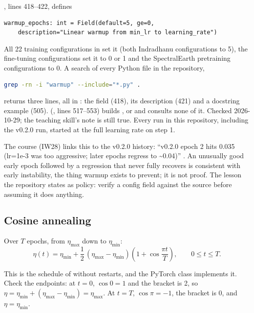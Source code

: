 \begin{sourcenote}
, lines 418--422, defines
\begin{lstlisting}
warmup_epochs: int = Field(default=5, ge=0,
    description="Linear warmup from min_lr to learning_rate")
\end{lstlisting}
All 22 training configurations in  set it (both Indradhanu configurations to 5),
the fine-tuning configurations set it to 0 or 1 and the SpectralEarth pretraining configurations to
0. A search of every Python file in the repository,
\begin{lstlisting}[language=bash]
grep -rn -i "warmup" --include="*.py" .
\end{lstlisting}
returns three lines, all in : the field (418), its description (421)
and a docstring example (505). 
(, lines 517--553) builds ,
 or  and consults none of it. Checked 2026-10-29; the teaching skill's
note is still true. Every run in this repository, including the v0.2.0 run, started at the full
learning rate on step 1.

The course (IW28) links this to the v0.2.0 history: ``v0.2.0 epoch 2 hits 0.035 (lr=1e-3 was too
aggressive; later epochs regress to \textasciitilde 0.04)''
. An unusually good early
epoch followed by a regression that never fully recovers is consistent with early
instability, the thing warmup exists to prevent; it is not proof. The lesson the repository
states as policy: verify a config field against the source before assuming it does anything.
\end{sourcenote}

\subsection{Cosine annealing}

\begin{definition}
Over $T$ epochs, from $\eta_{\max}$ down to $\eta_{\min}$:
\begin{equation}\label{eq:trainloop:cosine}
\eta(t) = \eta_{\min} + \frac{1}{2}\,(\eta_{\max} - \eta_{\min})\left(1 + \cos\frac{\pi t}{T}\right), \qquad 0 \le t \le T.
\end{equation}
\end{definition}
This is the schedule of \citet{loshchilov2017sgdr} without restarts, and the PyTorch class
 implements it. Check the endpoints: at $t = 0$, $\cos 0 = 1$ and the
bracket is 2, so $\eta = \eta_{\min} + (\eta_{\max} - \eta_{\min}) = \eta_{\max}$. At $t = T$,
$\cos\pi = -1$, the bracket is 0, and $\eta = \eta_{\min}$.

